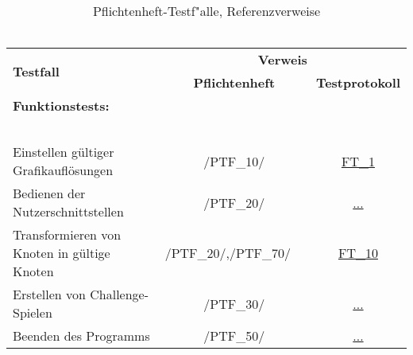 \begin{longtable}{p{0.5\hsize}p{0.275\hsize}p{0.275\hsize}}

	\caption{Pflichtenheft-Testf{"a}lle, Referenzverweise\\~\\}
	\label{Pflichtenheft:Tests:Referenzverweise}
	\\


	    \multirow{2}{*}{\textbf{Testfall}}
	  & \multicolumn{2}{c}{\textbf{Verweis}}
	  
	  \\ [14pt]
	  
	  & \multicolumn{1}{c}{\textbf{Pflichtenheft}}
	  & \multicolumn{1}{c}{\textbf{Testprotokoll}}
	  
	  \\ 
	     


	  \multicolumn{3}{l}{\textbf{Funktionstests:}}
	  
	\\
	
	  \multicolumn{3}{l}{~}
	  
	\\

	  \multicolumn{1}{L{6.5cm}}{Einstellen gültiger Grafikauflösungen}
	& \multicolumn{1}{c}{/PTF\_10/}
	& \multicolumn{1}{c}{\hyperref[FT:1]{FT\_1}}
	
	\\
	
	
	  \multicolumn{1}{L{6.5cm}}{Bedienen der Nutzerschnittstellen}
	& \multicolumn{1}{c}{/PTF\_20/}
	& \multicolumn{1}{c}{\hyperref[]{...}}
		
	\\

	  \multicolumn{1}{L{6.5cm}}{Transformieren von Knoten in gültige Knoten}
	& \multicolumn{1}{C{3cm}}{/PTF\_20/,\newline/PTF\_70/~~}
	& \multicolumn{1}{c}{\hyperref[FT:10]{FT\_10}}
	
	\\
	
	 \multicolumn{1}{L{6.5cm}}{Erstellen von Challenge-Spielen}
	& \multicolumn{1}{c}{/PTF\_30/}
	& \multicolumn{1}{c}{\hyperref[]{...}}
	
	\\
	
	  \multicolumn{1}{L{6.5cm}}{Beenden des Programms}
	& \multicolumn{1}{c}{/PTF\_50/}
	& \multicolumn{1}{c}{\hyperref[]{...}}
	

\end{longtable}
